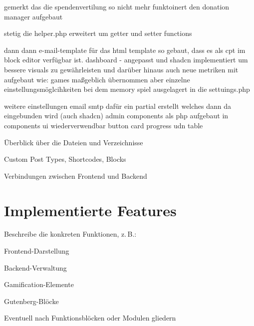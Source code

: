 gemerkt das die spendenvertilung so nicht mehr funktoinert den donation manager aufgebaut

stetig die helper.php erweitert um getter und setter functions



dann
dann e-mail-template für das html template so gebaut, dass es als cpt im block editor verfügbar ist.
dashboard - angepasst und shadcn implementiert um bessere visuals zu gewährleisten und darüber hinaus auch neue metriken mit aufgebaut wie:
games maßgeblich übernommen aber einzelne einstellungsmöglcihkeiten bei dem memory spiel ausgelagert in die settuings.php %

weitere einstellungen
email smtp dafür ein partial erstellt welches dann da eingebunden wird (auch shadcn)
admin components als php aufgebaut in components ui wiederverwendbar button card progress udn table

Überblick über die Dateien und Verzeichnisse

Custom Post Types, Shortcodes, Blocks

Verbindungen zwischen Frontend und Backend

\section{Implementierte Features}

Beschreibe die konkreten Funktionen, z. B.:

Frontend-Darstellung

Backend-Verwaltung

Gamification-Elemente

Gutenberg-Blöcke

Eventuell nach Funktionsblöcken oder Modulen gliedern

